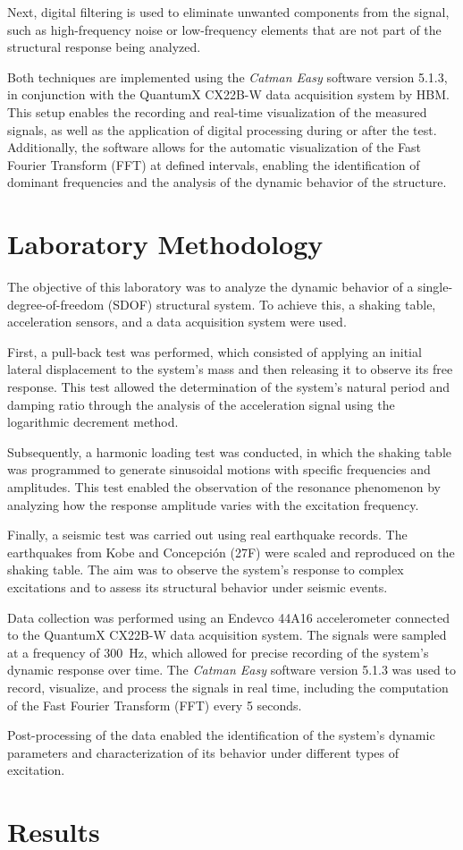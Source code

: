 \documentclass{article}  %
\begin{document}
Next, digital filtering is used to eliminate unwanted components from the signal, such as high-frequency noise or low-frequency elements that are not part of the structural response being analyzed.

Both techniques are implemented using the \textit{Catman Easy} software version 5.1.3, in conjunction with the QuantumX CX22B-W data acquisition system by HBM. This setup enables the recording and real-time visualization of the measured signals, as well as the application of digital processing during or after the test. Additionally, the software allows for the automatic visualization of the Fast Fourier Transform (FFT) at defined intervals, enabling the identification of dominant frequencies and the analysis of the dynamic behavior of the structure.


\newpage
\section{Laboratory Methodology}

The objective of this laboratory was to analyze the dynamic behavior of a single-degree-of-freedom (SDOF) structural system. To achieve this, a shaking table, acceleration sensors, and a data acquisition system were used.

First, a pull-back test was performed, which consisted of applying an initial lateral displacement to the system's mass and then releasing it to observe its free response. This test allowed the determination of the system’s natural period and damping ratio through the analysis of the acceleration signal using the logarithmic decrement method.

Subsequently, a harmonic loading test was conducted, in which the shaking table was programmed to generate sinusoidal motions with specific frequencies and amplitudes. This test enabled the observation of the resonance phenomenon by analyzing how the response amplitude varies with the excitation frequency.

Finally, a seismic test was carried out using real earthquake records. The earthquakes from Kobe and Concepción (27F) were scaled and reproduced on the shaking table. The aim was to observe the system’s response to complex excitations and to assess its structural behavior under seismic events.

Data collection was performed using an Endevco 44A16 accelerometer connected to the QuantumX CX22B-W data acquisition system. The signals were sampled at a frequency of 300~Hz, which allowed for precise recording of the system's dynamic response over time. The \textit{Catman Easy} software version 5.1.3 was used to record, visualize, and process the signals in real time, including the computation of the Fast Fourier Transform (FFT) every 5 seconds.

Post-processing of the data enabled the identification of the system’s dynamic parameters and characterization of its behavior under different types of excitation.

\newpage
\section{Results}
\end{document}
